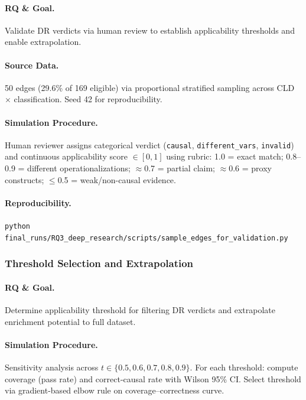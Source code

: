 \paragraph{RQ \& Goal.}
Validate DR verdicts via human review to establish applicability thresholds and enable extrapolation.

\paragraph{Source Data.}
50 edges (29.6\% of 169 eligible) via proportional stratified sampling across CLD $\times$ classification. Seed 42 for reproducibility.

\paragraph{Simulation Procedure.}
Human reviewer assigns categorical verdict (\texttt{causal}, \texttt{different\_vars}, \texttt{invalid}) and continuous applicability score $\in[0,1]$ using rubric: 1.0 = exact match; 0.8--0.9 = different operationalizations; $\approx$0.7 = partial claim; $\approx$0.6 = proxy constructs; $\leq$0.5 = weak/non-causal evidence.

\paragraph{Reproducibility.}
\texttt{python final\_runs/RQ3\_deep\_research/scripts/sample\_edges\_for\_validation.py}

\subsubsection{Threshold Selection and Extrapolation}
\label{sec:rq3_threshold_selection}

\paragraph{RQ \& Goal.}
Determine applicability threshold for filtering DR verdicts and extrapolate enrichment potential to full dataset.

\paragraph{Simulation Procedure.}
Sensitivity analysis across $t \in \{0.5, 0.6, 0.7, 0.8, 0.9\}$. For each threshold: compute coverage (pass rate) and correct-causal rate with Wilson 95\% CI. Select threshold via gradient-based elbow rule on coverage--correctness curve.

